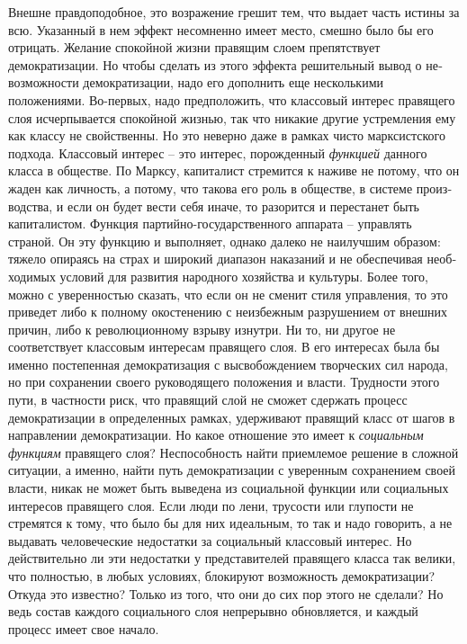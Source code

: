 \documentclass{book}
\begin{document}
Внешне правдоподобное, это возражение грешит тем, что вы­дает часть истины за всю. Указанный в нем эффект несомнен­но имеет место, смешно было бы его отрицать. Желание спо­койной жизни правящим слоем препятствует демократизации. Но чтобы сделать из этого эффекта решительный вывод о не­возможности демократизации, надо его дополнить еще несколь­кими положениями. Во-первых, надо предположить, что клас­совый интерес правящего слоя исчерпывается спокойной жиз­нью, так что никакие другие устремления ему как классу не свойственны. Но это неверно даже в рамках чисто марксистско­го подхода. Классовый интерес -- это интерес, порожденный \textit{функцией}  данного класса в обществе. По Марксу, капиталист стремится к наживе не потому, что он жаден как личность, а потому, что такова его роль в обществе, в системе произ­водства, и если он будет вести себя иначе, то разорится и пере­станет быть капиталистом. Функция партийно-государственно­го аппарата -- управлять страной. Он эту функцию и выполняет, однако далеко не 
наилучшим 
образом: тяжело опираясь на страх и широкий диапазон наказаний и не обеспечивая необ­ходимых условий для развития народного хозяйства и куль­туры. Более того, можно с уверенностью сказать, что если он не сменит стиля управления, то это приведет либо к полному окостенению с неизбежным разрушением от внешних причин, либо к революционному взрыву изнутри. Ни то, ни другое не соответствует классовым интересам правящего слоя. В его интересах была бы именно постепенная демократизация с вы­свобождением творческих сил народа, но при сохранении свое­го руководящего положения и власти. Трудности этого пути, в частности риск, что правящий слой не сможет сдержать про­цесс демократизации в определенных рамках, удерживают пра­вящий класс от шагов в направлении демократизации. Но какое отношение это имеет к \textit{социальным функциям}  правящего слоя? Неспособность найти приемлемое решение в сложной ситуации, а именно, найти путь демократизации с уверенным сохранением своей власти, никак не может быть выведена из 
со­циальной 
функции или социальных интересов правящего слоя. Если люди по лени, трусости или глупости не стремятся к тому, что было бы для них идеальным, то так и надо говорить, а не выдавать человеческие недостатки за социальный классовый интерес. Но действительно ли эти недостатки у представите­лей правящего класса так велики, что полностью, в любых условиях, блокируют возможность демократизации? Откуда это известно? Только из того, что они до сих пор этого не сде­лали? Но ведь состав каждого социального слоя непрерывно обновляется, и каждый процесс имеет свое начало.
\end{document}
